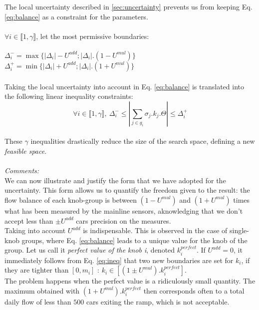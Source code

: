 The local uncertainty described in \ref{sec:uncertainty} prevents us from keeping Eq. \ref{eq:balance} as a constraint for the parameters.\\
\\
$\forall i \in {\llbracket 1,\gamma \rrbracket}$, let the most permissive boundaries:\\
\\
$\Delta_{i}^{-}=\max{\{|\Delta_{i}|-U^{add};|\Delta_{i}|.(1-U^{mul})\}}$\\
$\Delta_{i}^{+}=\min{\{|\Delta_{i}|+U^{add};|\Delta_{i}|.(1+U^{mul})\}}$\\
\\
Taking the local uncertainty into account in Eq. \ref{eq:balance} is translated into the following linear inequality constraints:\\
\begin{equation}
\label{eq:ineq}
	\forall i\in \llbracket 1,\gamma \rrbracket,\ \Delta_{i}^{-}\leq |\sum\limits_{j\in g_{i}}\sigma_{j}.k_{j}.\Theta| \leq \Delta_{i}^{+}
\end{equation}
\\
These $\gamma$ inequalities drastically reduce the size of the search space, defining a new \emph{feasible space}.\\
\\
\emph{Comments:}\\
We can now illustrate and justify the form that we have adopted for the uncertainty. This form allows us to quantify the freedom given to the result: the flow balance of each knob-group is between $(1-U^{mul})$ and $(1+U^{mul})$ times what has been measured by the mainline sensors, aknowledging that we don't accept less than $\pm U^{add}$ cars precision on the measures.\\
Taking into account $U^{add}$ is indispensable. This is observed in the case of single-knob groups, where Eq. \ref{eq:balance} leads to a unique value for the knob of the group. Let us call it \emph{perfect value of the knob i}, denoted $k_{i}^{perfect}$. If $U^{add}=0$, it immediately follows from Eq. \ref{eq:ineq} that two new boundaries are set for $k_{i}$, if they are tighter than $[0,m_{i}]$ : $k_{i}\in [(1\pm U^{mul}).k_{i}^{perfect}]$.\\
The problem happens when the perfect value is a ridiculously small quantity. The maximum obtained with $(1+ U^{mul}).k_{i}^{perfect}$ then corresponds often to a total daily flow of less than $500$ cars exiting the ramp, which is not acceptable.\\ 
\\

